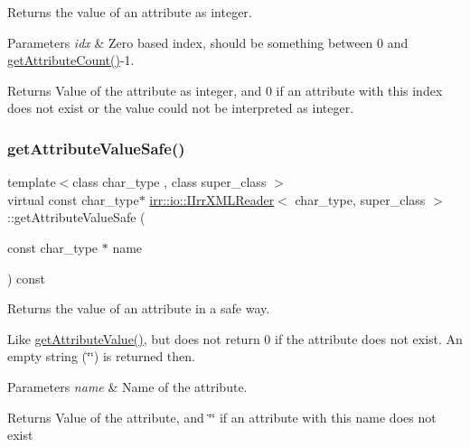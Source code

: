 Returns the value of an attribute as integer. 


\begin{DoxyParams}{Parameters}
{\em idx} & Zero based index, should be something between 0 and \hyperlink{classirr_1_1io_1_1IIrrXMLReader_a8f85253d2efb15061facdb9571b9c549}{get\+Attribute\+Count()}-\/1. \\
\hline
\end{DoxyParams}
\begin{DoxyReturn}{Returns}
Value of the attribute as integer, and 0 if an attribute with this index does not exist or the value could not be interpreted as integer. 
\end{DoxyReturn}
\mbox{\label{classirr_1_1io_1_1IIrrXMLReader_a7674852b2e24b2710b90aab10ef1fc22}} 
\subsubsection{\texorpdfstring{get\+Attribute\+Value\+Safe()}{getAttributeValueSafe()}}
{\footnotesize\ttfamily template$<$class char\+\_\+type , class super\+\_\+class $>$ \\
virtual const char\+\_\+type$\ast$ \hyperlink{classirr_1_1io_1_1IIrrXMLReader}{irr\+::io\+::\+I\+Irr\+X\+M\+L\+Reader}$<$ char\+\_\+type, super\+\_\+class $>$\+::get\+Attribute\+Value\+Safe (\begin{DoxyParamCaption}\item[{const char\+\_\+type $\ast$}]{name }\end{DoxyParamCaption}) const\hspace{0.3cm}{\ttfamily [pure virtual]}}



Returns the value of an attribute in a safe way. 

Like \hyperlink{classirr_1_1io_1_1IIrrXMLReader_a41bd71a1b9d4a80cd1d0257dedb35325}{get\+Attribute\+Value()}, but does not return 0 if the attribute does not exist. An empty string (\char`\"{}\char`\"{}) is returned then. 
\begin{DoxyParams}{Parameters}
{\em name} & Name of the attribute. \\
\hline
\end{DoxyParams}
\begin{DoxyReturn}{Returns}
Value of the attribute, and \char`\"{}\char`\"{} if an attribute with this name does not exist 
\end{DoxyReturn}
\mbox{\label{classirr_1_1io_1_1IIrrXMLReader_aecbe0698e8f9acf88e27dd53da984210}} 
